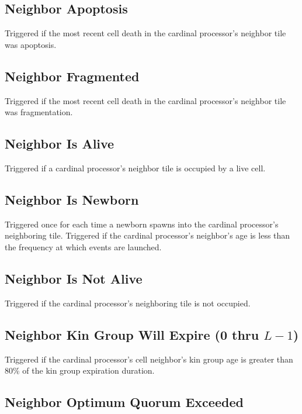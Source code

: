 \subsection{Neighbor Apoptosis}

Triggered if the most recent cell death in the cardinal processor's neighbor tile was apoptosis.

\subsection{Neighbor Fragmented}

Triggered if the most recent cell death in the cardinal processor's neighbor tile was fragmentation.

\subsection{Neighbor Is Alive}

Triggered if a cardinal processor's neighbor tile is occupied by a live cell.

\subsection{Neighbor Is Newborn}

Triggered once for each time a newborn spawns into the cardinal processor's neighboring tile.
Triggered if the cardinal processor's neighbor's age is less than the frequency at which events are launched.

\subsection{Neighbor Is Not Alive}

Triggered if the cardinal processor's neighboring tile is not occupied.

\subsection{Neighbor Kin Group Will Expire (0 thru $L-1$)}

Triggered if the cardinal processor's cell neighbor's kin group age is greater than 80\% of the kin group expiration duration.

\subsection{Neighbor Optimum Quorum Exceeded}

